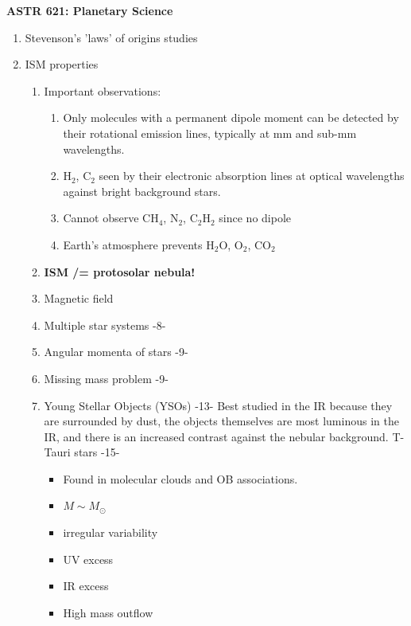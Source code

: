 \documentclass[12pt]{article}
\begin{document}
\textbf{ASTR 621: Planetary Science}

\begin{enumerate}
	\item Stevenson's 'laws' of origins studies
	\item ISM properties
        \begin{enumerate}
            \item Important observations:
                \begin{enumerate}
                    \item Only molecules with a permanent dipole moment can be detected by
                        their rotational emission lines, typically at mm and sub-mm
                        wavelengths.
                    \item H$_{2}$, C$_{2}$ seen by their electronic absorption lines at
                        optical wavelengths against bright background stars.
                    \item Cannot observe CH$_{4}$, N$_{2}$, C$_{2}$H$_{2}$ since no dipole
                    \item Earth's atmosphere prevents H$_{2}$O, O$_{2}$, CO$_{2}$
                \end{enumerate}
            \item \textbf{ISM /= protosolar nebula!}
            \item Magnetic field
            \item Multiple star systems -8-
            \item Angular momenta of stars -9-
            \item Missing mass problem -9-
            \item Young Stellar Objects (YSOs) -13-
                Best studied in the IR because they are surrounded by dust,
                the objects themselves are most luminous in the IR, and there
                is an increased contrast against the nebular background.
                T-Tauri stars -15-
                \begin{itemize}
                    \item Found in molecular clouds and OB associations.
                    \item $M \sim M_{\odot}$
                    \item irregular variability
                    \item UV excess
                    \item IR excess
                    \item High mass outflow

\end{itemize}
\end{enumerate}
\end{enumerate}
\end{document}
